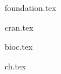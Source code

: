 \documentclass[a4paper]{report}
\begin{document}


\begin{article}
  {foundation.tex}
\end{article}
\newpage

\begin{article}
  {cran.tex}
\end{article}
\newpage

\begin{article}
  {bioc.tex}
\end{article}
\newpage

\begin{article}
  {ch.tex}
\end{article}
\newpage
\end{document}
